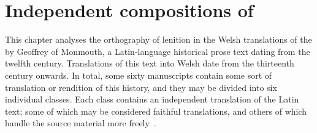 \chapter{Independent compositions of }
\label{cha:indep-comp-mwbr}
This chapter analyses the orthography of lenition in the Welsh translations of the   by Geoffrey of Monmouth, a Latin-language historical prose text dating from the twelfth century.
Translations of this text into Welsh date from the thirteenth century onwards.
In total, some sixty manuscripts contain some sort of translation or rendition of this history, and they may be divided into six individual classes.
Each  class contains an independent translation of the Latin text; some of which may be considered faithful translations, and others of which handle the source material more freely~\autocite[xxiv-xxxi]{roberts_brut_1971}.

